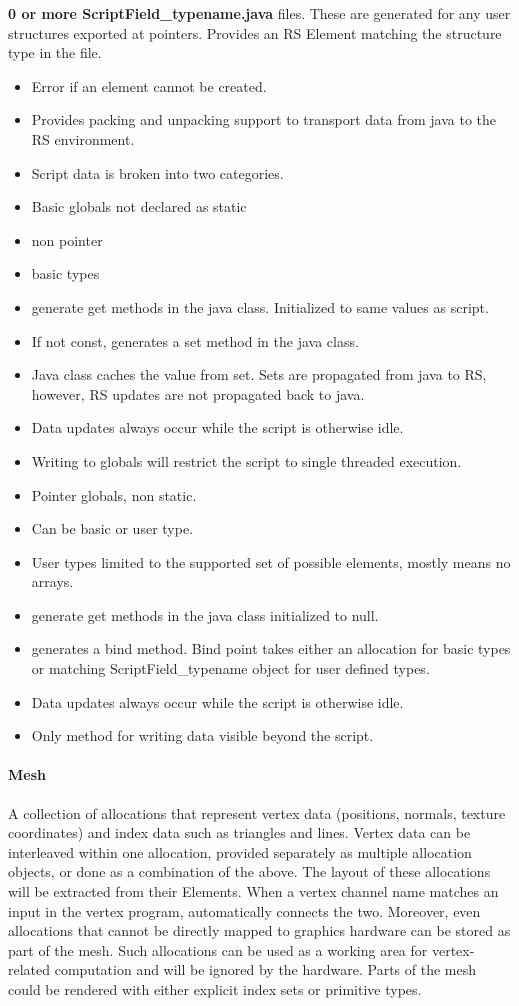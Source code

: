 \textbf{0 or more ScriptField\_typename.java} files.  These are generated for any user structures exported at pointers.
Provides an RS Element matching the structure type in the file.
\begin{itemize}
\item Error if an element cannot be created.
\item Provides packing and unpacking support to transport data from java to the RS environment.
\item Script data is broken into two categories.
\item Basic globals not declared as static
\item non pointer
\item basic types
\item generate get methods in the java class.  Initialized to same values as script.
\item If not const, generates a set method in the java class.
\item Java class caches the value from set. Sets are propagated from java to RS, however, RS updates are not propagated back to java.
\item Data updates always occur while the script is otherwise idle. 
\item Writing to globals will restrict the script to single threaded execution.
\item Pointer globals, non static.
\item Can be basic or user type.
\item User types limited to the supported set of possible elements, mostly means no arrays.
\item generate get methods in the java class initialized to null.
\item generates a bind method.  Bind point takes either an allocation for basic types or matching ScriptField\_typename object for user defined types.
\item Data updates always occur while the script is otherwise idle. 
\item Only method for writing data visible beyond the script.
\end{itemize}

\paragraph{Mesh}
A collection of allocations that represent vertex data (positions, normals, texture coordinates) and index data such as triangles and lines. Vertex data can be interleaved within one allocation, provided separately as multiple allocation objects, or done as a combination of the above. The layout of these allocations will be extracted from their Elements. When a vertex channel name matches an input in the vertex program, \RS{} automatically connects the two. Moreover, even allocations that cannot be directly mapped to graphics hardware can be stored as part of the mesh. Such allocations can be used as a working area for vertex-related computation and will be ignored by the hardware. Parts of the mesh could be rendered with either explicit index sets or primitive types.

